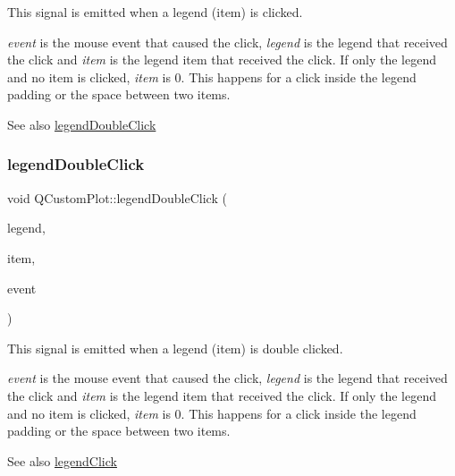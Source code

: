 This signal is emitted when a legend (item) is clicked.

{\itshape event} is the mouse event that caused the click, {\itshape legend} is the legend that received the click and {\itshape item} is the legend item that received the click. If only the legend and no item is clicked, {\itshape item} is 0. This happens for a click inside the legend padding or the space between two items.

\begin{DoxySeeAlso}{See also}
\hyperlink{class_q_custom_plot_a0250f835c044521df1619b132288bca7}{legend\+Double\+Click} 
\end{DoxySeeAlso}
\mbox{\label{class_q_custom_plot_a0250f835c044521df1619b132288bca7}} 
\subsubsection{\texorpdfstring{legend\+Double\+Click}{legendDoubleClick}}
{\footnotesize\ttfamily void Q\+Custom\+Plot\+::legend\+Double\+Click (\begin{DoxyParamCaption}\item[{\hyperlink{class_q_c_p_legend}{Q\+C\+P\+Legend} $\ast$}]{legend,  }\item[{\hyperlink{class_q_c_p_abstract_legend_item}{Q\+C\+P\+Abstract\+Legend\+Item} $\ast$}]{item,  }\item[{Q\+Mouse\+Event $\ast$}]{event }\end{DoxyParamCaption})\hspace{0.3cm}{\ttfamily [signal]}}

This signal is emitted when a legend (item) is double clicked.

{\itshape event} is the mouse event that caused the click, {\itshape legend} is the legend that received the click and {\itshape item} is the legend item that received the click. If only the legend and no item is clicked, {\itshape item} is 0. This happens for a click inside the legend padding or the space between two items.

\begin{DoxySeeAlso}{See also}
\hyperlink{class_q_custom_plot_a79cff0baafbca10a3aaf694d2d3b9ab3}{legend\+Click} 
\end{DoxySeeAlso}
\mbox{\label{class_q_custom_plot_a9b232142c64fcf273a953ee08e5b90e9}} 
